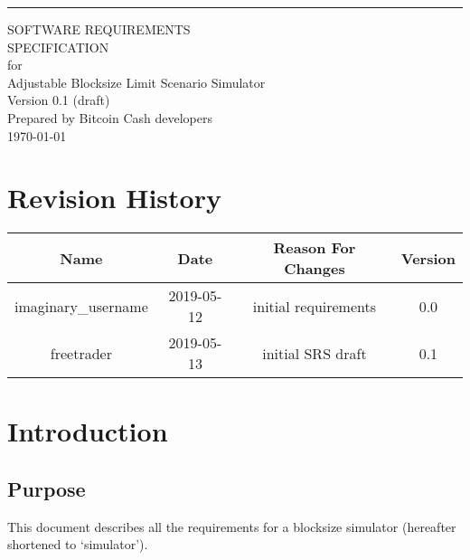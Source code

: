 \documentclass{scrreprt}
\date{}
\def\myversion{0.1 }
\begin{document}
\begin{flushright}
    \rule{16cm}{5pt}\vskip1cm
    \begin{bfseries}
        \Huge{SOFTWARE REQUIREMENTS\\ SPECIFICATION}\\
        \vspace{1.9cm}
        for\\
        \vspace{1.9cm}
        Adjustable Blocksize Limit Scenario Simulator\\
        \vspace{1.9cm}
        \LARGE{Version \myversion (draft)}\\
        \vspace{1.9cm}
        Prepared by Bitcoin Cash developers\\
        \vspace{1.9cm}
        \today\\
    \end{bfseries}
\end{flushright}

\tableofcontents


\chapter*{Revision History}

\begin{center}
    \begin{tabular}{|c|c|c|c|}
        \hline
	    Name & Date & Reason For Changes & Version\\
        \hline
	    imaginary_username & 2019-05-12 & initial requirements & 0.0\\
        \hline
	    freetrader & 2019-05-13 & initial SRS draft & 0.1\\
        \hline
    \end{tabular}
\end{center}

\chapter{Introduction}


\section{Purpose}
This document describes all the requirements for a blocksize simulator
(hereafter shortened to `simulator').
\end{document}
